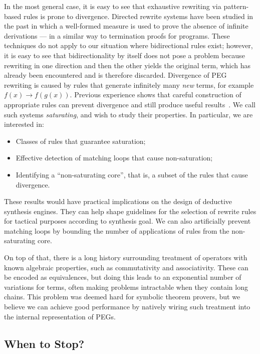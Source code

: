 In the most general case, it is easy to see that exhaustive rewriting via
pattern-based rules is prone to divergence.
Directed rewrite systems have been studied in the past in which a well-formed
measure is used to prove the absence of infinite derivations --- in a similar
way to termination proofs for programs.
These techniques do not apply to our situation where bidirectional rules exist;
however, it is easy to see that bidirectionality by itself does not pose a
problem because rewriting in one direction and then the other yields the
original term, which has already been encountered and is therefore discarded.
Divergence of PEG rewriting is caused by rules that generate infinitely many
\emph{new} terms, for example $f(x) \to f(g(x))$.
Previous experience shows that careful construction of appropriate rules can
prevent divergence and still produce useful results~\cite{LPAR2013/Itzhaky}.
We call such systems \emph{saturating}, and wish to study their properties.
In particular, we are interested in:
\begin{itemize}
  \item Classes of rules that guarantee saturation;
  \item Effective detection of matching loops that cause non-saturation;
  \item Identifying a ``non-saturating core'', that is, a subset of the
    rules that cause divergence. 
\end{itemize}

These results would have practical implications on the design of
deductive synthesis engines.
They can help shape guidelines for the selection of rewrite rules for
tactical purposes according to synthesis goal.
We can also artificially prevent matching loops by bounding the number of
applications of rules from the non-saturating core.

On top of that, there is a long history surrounding treatment of
operators with known algebraic properties, such as commutativity
and associativity.
These can be encoded as equivalences, but doing this leads to an exponential
number of variations for terms, often making problems intractable when
they contain long chains.
This problem was deemed hard for symbolic theorem provers, but we
believe we can achieve good performance by natively wiring such treatment
into the internal representation of PEGs.

\subsection{When to Stop?}


